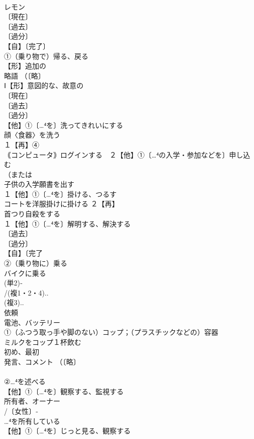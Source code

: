 \documentclass[8pt]{extreport}
\begin{document}
\begin{CJK}{UTF8}{min}
\\	レモン　
\\	〔現在〕
\\	〔過去〕
\\	〔過分〕
\\	【自】〔完了〕
\\	①（乗り物で）帰る、戻る
\\	【形】追加の
\\	略語 （〔略〕
\\	Ⅰ【形】意図的な、故意の 
\\	〔現在〕
\\	〔過去〕
\\	〔過分〕
\\	【他】①〔…⁴を〕洗ってきれいにする 
\\	顔〈食器〉を洗う
\\	１【再】④
\\	｟コンピュータ｠ログインする　２【他】①〔…⁴の入学・参加などを〕申し込む 
\\	（または
\\	子供の入学願書を出す 
\\	１【他】①〔…⁴を〕掛ける、つるす 
\\	コートを洋服掛けに掛ける ２【再】
\\	首つり自殺をする
\\	１【他】①〔…⁴を〕解明する、解決する 
\\	〔過去〕
\\	〔過分〕
\\	【自】〔完了
\\	②（乗り物に）乗る 
\\	バイクに乗る
\\	(単2)‐
\\	/(複1・2・4)..
\\	(複3)..
\\	依頼 
\\	電池、バッテリー 
\\	①（ふつう取っ手や脚のない）コップ；（プラスチックなどの）容器 
\\	ミルクをコップ１杯飲む 
\\	初め、最初 
\\	発言、コメント （〔略〕
\\	[派生] 
\\	②…⁴を述べる
\\	【他】①〔…⁴を〕観察する、監視する 
\\	所有者、オーナー 
\\	/〔女性〕‐
\\	…⁴を所有している
\\	【他】①〔…⁴を〕じっと見る、観察する 

\end{CJK}
\end{document}
